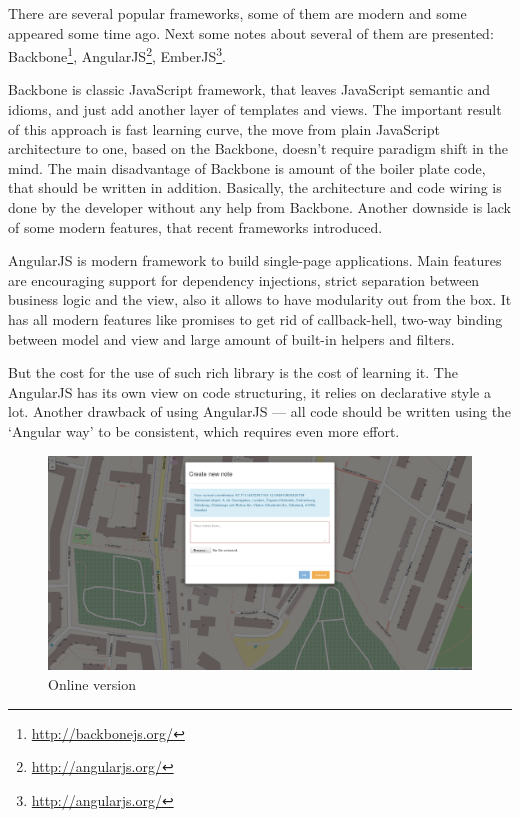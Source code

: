 \documentclass[12pt,a4paper]{article}
\begin{document}
There are several popular frameworks, some of them are modern and some appeared
some time ago. Next some notes about several of them are presented:
Backbone\footnote{\url{http://backbonejs.org/}},
AngularJS\footnote{\url{http://angularjs.org/}},
EmberJS\footnote{\url{http://angularjs.org/}}.

Backbone is classic JavaScript framework, that leaves JavaScript semantic and
idioms, and just add another layer of templates and views. The important result
of this approach is fast learning curve, the move from plain JavaScript
architecture to one, based on the Backbone, doesn't require paradigm shift in
the mind. The main disadvantage of Backbone is amount of the boiler plate code,
that should be written in addition. Basically, the architecture and code wiring
is done by the developer without any help from Backbone. Another downside is
lack of some modern features, that recent frameworks introduced.

AngularJS is modern framework to build single-page applications. Main features
are encouraging support for dependency injections, strict separation between
business logic and the view, also it allows to have modularity out from the box.
It has all modern features like promises to get rid of callback-hell, two-way
binding between model and view and large amount of built-in helpers and filters.

But the cost for the use of such rich library is the cost of learning it. The
AngularJS has its own view on code structuring, it relies on declarative style a
lot. Another drawback of using AngularJS --- all code should be written using
the `Angular way' to be consistent, which requires even more effort.

\begin{figure}[h]
  \begin{center}
    \includegraphics[width=\textwidth]{res/online}
  \end{center}
  \caption{Online version}
\end{figure}
\end{document}
